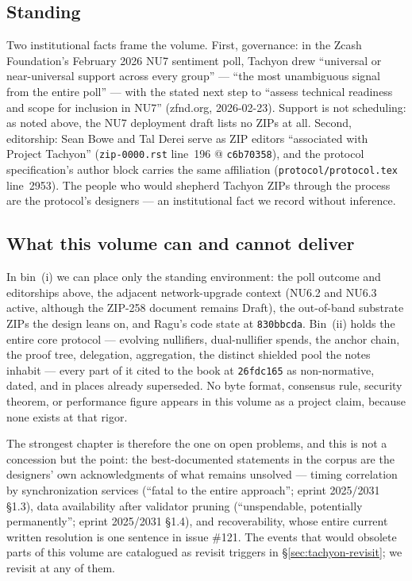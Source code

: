 \documentclass[11pt,a4paper]{article}
\theoremstyle{definition}
\begin{document}
\subsection{Standing}\label{sec:tachyon-standing}

Two institutional facts frame the volume. First, governance: in the Zcash
Foundation's February 2026 NU7 sentiment poll, Tachyon drew ``universal or
near-universal support across every group'' --- ``the most unambiguous signal
from the entire poll'' --- with the stated next step to ``assess technical
readiness and scope for inclusion in NU7'' (zfnd.org, 2026-02-23). Support is
not scheduling: as noted above, the NU7 deployment draft lists no ZIPs at all.
Second, editorship: Sean Bowe and Tal Derei serve as ZIP editors ``associated
with Project Tachyon'' (\texttt{zip-0000.rst} line~196 @ \texttt{c6b70358}),
and the protocol specification's author block carries the same affiliation
(\texttt{protocol/protocol.tex} line~2953). The people who would shepherd
Tachyon ZIPs through the process are the protocol's designers --- an
institutional fact we record without inference.

\subsection{What this volume can and cannot deliver}\label{sec:tachyon-expect}

In bin~(i) we can place only the standing environment: the poll outcome and
editorships above,
the adjacent network-upgrade context (NU6.2 and NU6.3 active, although the
ZIP-258 document remains Draft), the
out-of-band substrate ZIPs the design leans on, and Ragu's code state at
\texttt{830bbcda}. Bin~(ii) holds the entire core protocol --- evolving
nullifiers, dual-nullifier spends, the anchor chain, the proof tree,
delegation, aggregation, the distinct shielded pool the notes inhabit ---
every part of it cited to the book at \texttt{26fdc165} as non-normative,
dated, and in places already
superseded. No byte format, consensus rule, security theorem, or performance
figure appears in this volume as a project claim, because none exists at that
rigor.

The strongest chapter is therefore the one on open problems, and this is not a
concession but the point: the best-documented statements in the corpus are the
designers' own acknowledgments of what remains unsolved --- timing correlation
by synchronization services (``fatal to the entire approach''; eprint
2025/2031 \S1.3), data availability after validator pruning (``unspendable,
potentially permanently''; eprint 2025/2031 \S1.4), and recoverability, whose
entire current written resolution is one sentence in issue \#121. The events
that would obsolete parts of this volume are catalogued as revisit triggers
in \S\ref{sec:tachyon-revisit}; we revisit at any of them.
\end{document}
